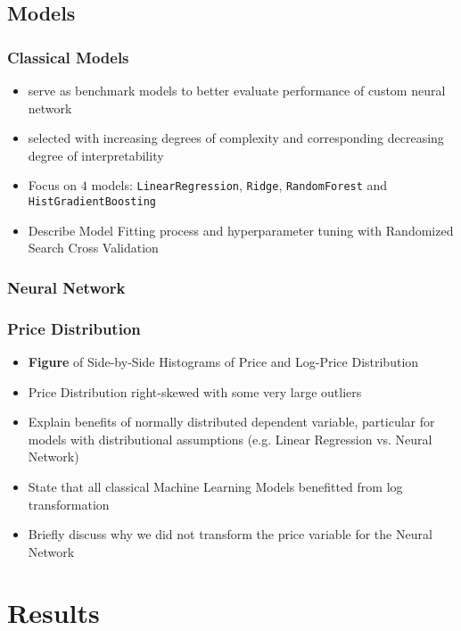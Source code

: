 \documentclass[12pt, letterpaper]{article}
\begin{document}
\subsection{Models}

\subsubsection{Classical Models}
\begin{itemize}
    \item serve as benchmark models to better evaluate performance of custom neural network
    \item selected with increasing degrees of complexity and corresponding decreasing degree of interpretability
    \item Focus on $4$ models: \texttt{LinearRegression}, \texttt{Ridge}, \texttt{RandomForest} and \texttt{HistGradientBoosting}
    \item Describe Model Fitting process and hyperparameter tuning with Randomized Search Cross Validation
\end{itemize}

\subsubsection{Neural Network}


\subsubsection{Price Distribution}
\begin{itemize}
    \item \textbf{Figure} of Side-by-Side Histograms of Price and Log-Price Distribution
    \item Price Distribution right-skewed with some very large outliers
    \item Explain benefits of normally distributed dependent variable, particular for models with distributional assumptions (e.g. Linear Regression vs. Neural Network)
    \item State that all classical Machine Learning Models benefitted from log transformation
    \item Briefly discuss why we did not transform the price variable for the Neural Network
\end{itemize}


\section{Results}
\end{document}

